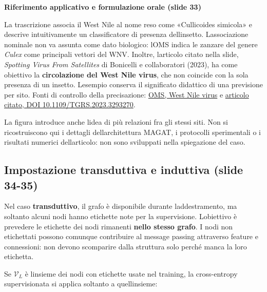 \documentclass[11pt,a4paper,oneside,openany]{book}
\renewenvironment{quote}{\list{}{\leftmargin=1em\rightmargin=0pt}\item\relax}{\endlist}
\begin{document}
\begin{quote}
\textbf{Riferimento applicativo e formulazione orale (slide 33)}
\end{quote}

\begin{quote}
La trascrizione associa il West Nile al nome reso come «Cullicoides simicola» e descrive intuitivamente un classificatore di presenza dell\textquotesingle insetto. L\textquotesingle associazione nominale non va assunta come dato biologico: l\textquotesingle OMS indica le zanzare del genere \emph{Culex} come principali vettori del WNV. Inoltre, l\textquotesingle articolo citato nella slide, \emph{Spotting Virus From Satellites} di Bonicelli e collaboratori (2023), ha come obiettivo la \textbf{circolazione del West Nile virus}, che non coincide con la sola presenza di un insetto. L\textquotesingle esempio conserva il significato didattico di una previsione per sito. Fonti di controllo della precisazione: \href{https://www.who.int/news-room/fact-sheets/detail/west-nile-virus}{OMS, West Nile virus} e \href{https://doi.org/10.1109/TGRS.2023.3293270}{articolo citato, DOI 10.1109/TGRS.2023.3293270}.
\end{quote}

La figura introduce anche l\textquotesingle idea di più relazioni fra gli stessi siti. Non si ricostruiscono qui i dettagli dell\textquotesingle architettura MAGAT, i protocolli sperimentali o i risultati numerici dell\textquotesingle articolo: non sono sviluppati nella spiegazione del caso.

\subsection{Impostazione transduttiva e induttiva (slide 34-35)}\label{f05-n30-r635}

Nel caso \textbf{transduttivo}, il grafo è disponibile durante l\textquotesingle addestramento, ma soltanto alcuni nodi hanno etichette note per la supervisione. L\textquotesingle obiettivo è prevedere le etichette dei nodi rimanenti \textbf{nello stesso grafo}. I nodi non etichettati possono comunque contribuire al message passing attraverso feature e connessioni: non devono scomparire dalla struttura solo perché manca la loro etichetta.

Se \(\mathcal V_L\) è l\textquotesingle insieme dei nodi con etichette usate nel training, la cross-entropy supervisionata si applica soltanto a quell\textquotesingle insieme:
\end{document}
